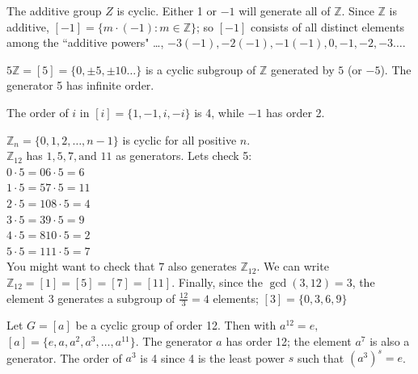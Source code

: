 \documentclass[12pt]{book}
\theoremstyle{definition}
\def\Z{\mathbb{Z}}
\begin{document}
\begin{tcexample}{}{}
The additive group $Z$ is cyclic. Either 1 or $-1$ will generate all of $\Z$. Since $ \Z $ is additive, $ [-1]=\{m\cdot (-1): m\in \Z \} $; so $ [-1] $ consists of all distinct elements among the ``additive powers" \dots, $ -3(-1),-2(-1),-1(-1),0,-1,-2,-3\dots. $
\end{tcexample}

\begin{tcexample}{}{}
	 $ 5\Z=[5]=\{0,\pm5,\pm10\dots \} $ is a cyclic subgroup of $ \Z $ generated by $ 5 $ (or $ -5 $). The generator 5 has infinite order.
\end{tcexample}

\begin{tcexample}{}{}
	The order of $ i $ in $ [i]=\{1,-1,i,-i\} $ is 4, while $ -1 $ has order 2.
\end{tcexample}

\begin{tcexample}{}{}
$ \Z_n=\{0,1,2,\dots, n-1\} $ is cyclic for all positive $ n $.\\
$ \Z_{12} $ has $1, 5, 7, \text{and } 11$ as generators. Lets check 5:\\
$ 0\cdot5=0 $\hspace{1cm}$ 6\cdot 5=6 $\\
$ 1\cdot5=5 $\hspace{1cm}$7\cdot 5=11 $\\
$ 2\cdot5=10$\hspace{.8cm}$8\cdot 5=4 $\\
$ 3\cdot5=3 $\hspace{1cm}$ 9\cdot 5=9 $\\
$ 4\cdot5=8 $\hspace{1cm}$ 10\cdot 5=2 $\\
$ 5\cdot5=1 $\hspace{1cm}$ 11\cdot 5=7 $\\
You might want to check that $ 7 $ also generates $ \Z_{12} $. We can write $ \Z_{12}=[1]=[5]=[7]=[11] $. Finally, since the $ \gcd(3,12)=3 $, the element $ 3 $ generates a subgroup of $ \frac{12}{3}=4 $ elements; $ [3]=\{0,3,6,9\} $
\end{tcexample}

\begin{tcexample}{}{}
 Let $ G=[a] $ be a cyclic group  of order 12. Then with $ a^{12}=e,$\\$[a]=\{e,a,a^2,a^3,\dots,a^{11}\}. $ The generator $ a $ has order 12; the element $ a^7 $ is also a generator. The order of $ a^3 $ is 4 since 4 is the least power $ s $ such that $ (a^3)^s=e $.
\end{tcexample}
\end{document}
